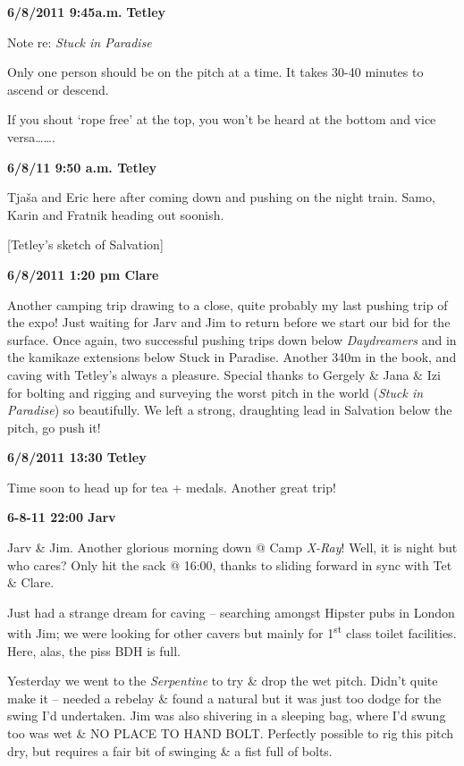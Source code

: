\textbf{6/8/2011 9:45a.m.} \textbf{Tetley}

Note re: \emph{Stuck in Paradise}

Only one person should be on the pitch at a time. It takes 30-40 minutes
to ascend or descend.

If you shout `rope free' at the top, you won't be heard at the bottom
and vice versa\ldots{}\ldots{}.

\textbf{6/8/11 9:50 a.m. Tetley}

Tjaša and Eric here after coming down and pushing on the night train.
Samo, Karin and Fratnik heading out soonish.

{[}Tetley's sketch of Salvation{]}

\textbf{6/8/2011 1:20 pm Clare}

Another camping trip drawing to a close, quite probably my last pushing
trip of the expo! Just waiting for Jarv and Jim to return before we
start our bid for the surface. Once again, two successful pushing trips
down below \emph{Daydreamers} and in the kamikaze extensions below Stuck
in Paradise. Another 340m in the book, and caving with Tetley's always a
pleasure. Special thanks to Gergely \& Jana \& Izi for bolting and
rigging and surveying the worst pitch in the world (\emph{Stuck in
Paradise}) so beautifully. We left a strong, draughting lead in
Salvation below the pitch, go push it!

\textbf{6/8/2011 13:30 Tetley}

Time soon to head up for tea + medals. Another great trip!

\textbf{6-8-11 22:00 Jarv}

Jarv \& Jim. Another glorious morning down @ Camp \emph{X-Ray}! Well, it
is night but who cares? Only hit the sack @ 16:00, thanks to sliding
forward in sync with Tet \& Clare.

Just had a strange dream for caving -- searching amongst Hipster pubs in
London with Jim; we were looking for other cavers but mainly for
1\textsuperscript{st} class toilet facilities. Here, alas, the piss BDH
is full.

Yesterday we went to the \emph{Serpentine} to try \& drop the wet pitch.
Didn't quite make it -- needed a rebelay \& found a natural but it was
just too dodge for the swing I'd undertaken. Jim was also shivering in a
sleeping bag, where I'd swung too was wet \& NO PLACE TO HAND BOLT.
Perfectly possible to rig this pitch dry, but requires a fair bit of
swinging \& a fist full of bolts.

